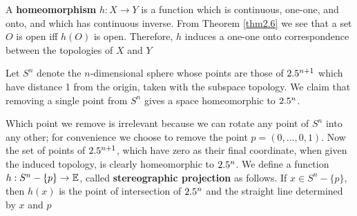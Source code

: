 \documentclass[11pt]{article}
\begin{document}
A \textbf{homeomorphism} \(h:X\to Y\) is a function which is continuous, one-one, and
onto, and which has continuous inverse. From Theorem \ref{thm2.6}  we see that
a set \(O\) is open iff \(h(O)\) is open. Therefore, \(h\) induces a one-one
onto correspondence between the topologies of \(X\) and \(Y\)

\begin{examplle}[]
Let \(S^n\) denote the \(n\)-dimensional sphere whose points are those of
\(2.5^{n+1}\) which have distance 1 from the origin, taken with the subspace
topology. We claim that removing a single point from \(S^n\) gives a space
homeomorphic to \(2.5^n\).

Which point we remove is irrelevant because we can rotate any point of
\(S^n\) into any other; for convenience we choose to remove the point
\(p=(0,\dots,0,1)\). Now the set of points of \(2.5^{n+1}\), which have zero
as their final coordinate, when given the induced topology, is clearly
homeomorphic to \(2.5^n\). We define a function \(h:S^n-\{p\}\to\mathbb{E}\), called
\textbf{stereographic projection} as follows. If \(x\in S^n-\{p\}\), then \(h(x)\) is
the point of intersection of \(2.5^n\)  and the straight line determined by
\(x\) and \(p\)

   \begin{center}
\end{center}
\end{examplle}
\end{document}
